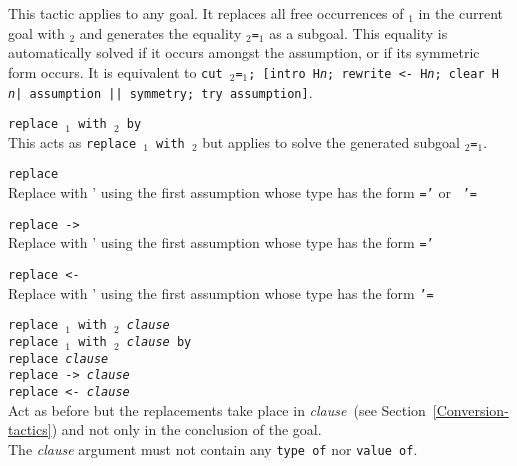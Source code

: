 This tactic applies to any goal. It replaces all free occurrences of
{\term$_1$} in the current goal with {\term$_2$} and generates the
equality {\term$_2$}{\tt =}{\term$_1$} as a subgoal. This equality is
automatically solved if it occurs amongst the assumption, or if its
symmetric form occurs.  It is equivalent to {\tt cut
\term$_2$=\term$_1$; [intro H{\sl n}; rewrite <- H{\sl n}; clear H{\sl
n}| assumption || symmetry; try assumption]}.

\begin{ErrMsgs}
\item {}
\end{ErrMsgs}

\begin{Variants}
\item {\tt replace {\term$_1$} with {\term$_2$} by \tac}\\ This acts
  as {\tt replace {\term$_1$} with {\term$_2$}} but applies {\tt \tac}
  to solve the generated subgoal {\tt \term$_2$=\term$_1$}.
\item {\tt replace {\term}}\\ Replace {\term} with {\term'} using the
  first assumption whose type has the form {\tt \term=\term'} or {\tt
    \term'=\term}
\item {\tt replace -> {\term}}\\ Replace {\term} with {\term'} using the
  first assumption whose type has the form {\tt \term=\term'}
\item {\tt replace <- {\term}}\\ Replace {\term} with {\term'} using the
  first assumption whose type has the form {\tt \term'=\term}
\item {\tt replace {\term$_1$} with {\term$_2$} \textit{clause} }\\
    {\tt replace {\term$_1$} with {\term$_2$} \textit{clause} by \tac }\\ 
    {\tt replace {\term} \textit{clause}}\\ 
    {\tt replace -> {\term} \textit{clause}}\\ 
    {\tt replace <- {\term} \textit{clause}}\\ 
    Act as before but the replacements take place in
    \textit{clause}~(see Section~\ref{Conversion-tactics}) and not only
    in the conclusion of the goal.\\
    The  \textit{clause} argument must  not contain  any \texttt{type  of} nor  \texttt{value  of}.
\end{Variants}

